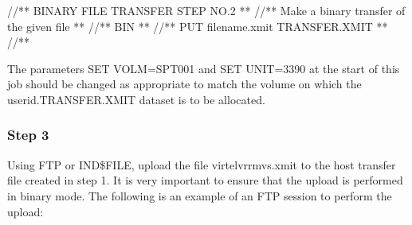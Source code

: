 \documentclass[letterpaper,10pt,english]{sphinxmanual}
\begin{document}
\begin{sphinxVerbatim}[commandchars=\\\{\}]
//*\PYGZhy{}\PYGZhy{}* BINARY FILE TRANSFER \PYGZhy{} STEP NO.2                            *\PYGZhy{}\PYGZhy{}*
//*\PYGZhy{}\PYGZhy{}* Make a binary transfer of the given file                    *\PYGZhy{}\PYGZhy{}*
//*\PYGZhy{}\PYGZhy{}* BIN                                                         *\PYGZhy{}\PYGZhy{}*
//*\PYGZhy{}\PYGZhy{}* PUT filename.xmit TRANSFER.XMIT                             *\PYGZhy{}\PYGZhy{}*
//*\PYGZhy{}\PYGZhy{}\PYGZhy{}\PYGZhy{}\PYGZhy{}\PYGZhy{}\PYGZhy{}\PYGZhy{}\PYGZhy{}\PYGZhy{}\PYGZhy{}\PYGZhy{}\PYGZhy{}\PYGZhy{}\PYGZhy{}\PYGZhy{}\PYGZhy{}\PYGZhy{}\PYGZhy{}\PYGZhy{}\PYGZhy{}\PYGZhy{}\PYGZhy{}\PYGZhy{}\PYGZhy{}\PYGZhy{}\PYGZhy{}\PYGZhy{}\PYGZhy{}\PYGZhy{}\PYGZhy{}\PYGZhy{}\PYGZhy{}\PYGZhy{}\PYGZhy{}\PYGZhy{}\PYGZhy{}\PYGZhy{}\PYGZhy{}\PYGZhy{}\PYGZhy{}\PYGZhy{}\PYGZhy{}\PYGZhy{}\PYGZhy{}\PYGZhy{}\PYGZhy{}\PYGZhy{}\PYGZhy{}\PYGZhy{}\PYGZhy{}\PYGZhy{}\PYGZhy{}\PYGZhy{}\PYGZhy{}\PYGZhy{}\PYGZhy{}\PYGZhy{}\PYGZhy{}\PYGZhy{}\PYGZhy{}\PYGZhy{}\PYGZhy{}\PYGZhy{}\PYGZhy{}\PYGZhy{}\PYGZhy{}*
\end{sphinxVerbatim}


The parameters SET VOLM=SPT001 and SET UNIT=3390 at the start of this job should be changed as appropriate to match the volume on which the userid.TRANSFER.XMIT dataset is to be allocated.

\newpage


\subsubsection{Step 3}
\label{\detokenize{Installation_Guide:step-3}}
Using FTP or IND\$FILE, upload the file virtelvrrmvs.xmit to the host transfer file created in step 1. It is very important to ensure that the upload is performed in binary mode. The following is an example of an FTP session to perform the upload:
\end{document}
